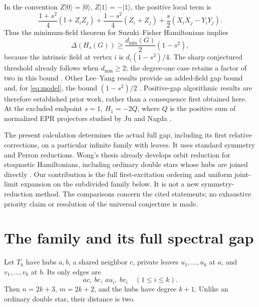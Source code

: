 \documentclass[11pt]{article}
\newcommand{\ket}[1]{|#1\rangle}
\newcommand{\Id}{\mathbb I}
\begin{document}
In the convention $Z\ket{0}=\ket{0}$, $Z\ket{1}=-\ket{1}$, the positive
local term is
\begin{equation}
 \frac{1+s^2}{4}(\Id+Z_iZ_j)
 +\frac{1-s^2}{4}(Z_i+Z_j)
 +\frac{s}{2}(X_iX_j-Y_iY_j).
 \label{eq:pauli}
\end{equation}
Thus the minimum-field theorem for Suzuki--Fisher Hamiltonians
\cite[Theorem 1]{Bravyi2026} implies
\begin{equation}
 \Delta(H_s(G))\geq \frac{d_{\min}(G)}{2}(1-s^2),
 \label{eq:prior}
\end{equation}
because the intrinsic field at vertex $i$ is $d_i(1-s^2)/4$.
The sharp conjectured threshold already follows when $d_{\min}\geq2$;
the degree-one case retains a factor of two in this bound
\cite[Section 5.4]{Wei2026}. Other Lee--Yang results provide an
added-field gap bound \cite[Theorem 11]{Rayudu2026} and, for
\eqref{eq:model}, the bound $(1-s^2)/2$
\cite[Theorem 6.10]{Hofgard2026}. Positive-gap algorithmic results are
therefore established prior work, rather than a consequence first
obtained here. At the excluded endpoint $s=1$, $H_1=-2Q$, where $Q$
is the positive sum of normalized EPR projectors studied by Ju and
Nagda \cite{Ju2025}.

The present calculation determines the actual full gap, including its
first relative corrections, on a particular infinite family with leaves.
It uses standard symmetry and Perron reductions. Wong's thesis already
develops orbit reduction for stoquastic Hamiltonians, including ordinary
double stars whose hubs are joined directly
\cite[Section 3.3, Theorem 13 and Example 2]{WongThesis2026}.
Our contribution is the full first-excitation ordering and uniform
joint-limit expansion on the subdivided family below. It is not a new
symmetry-reduction method. The comparisons concern the cited statements;
no exhaustive priority claim or resolution of the universal conjecture
is made.

\section{The family and its full spectral gap}

Let $T_k$ have hubs $a,b$, a shared neighbor $c$, private leaves
$u_1,\ldots,u_k$ at $a$, and $v_1,\ldots,v_k$ at $b$. Its only edges are
\begin{equation}
 ac,\ bc,\ au_i,\ bv_i\quad(1\leq i\leq k).
 \label{eq:graph}
\end{equation}
Then $n=2k+3$, $m=2k+2$, and the hubs have degree $k+1$.
Unlike an ordinary double star, their distance is two.
\end{document}
